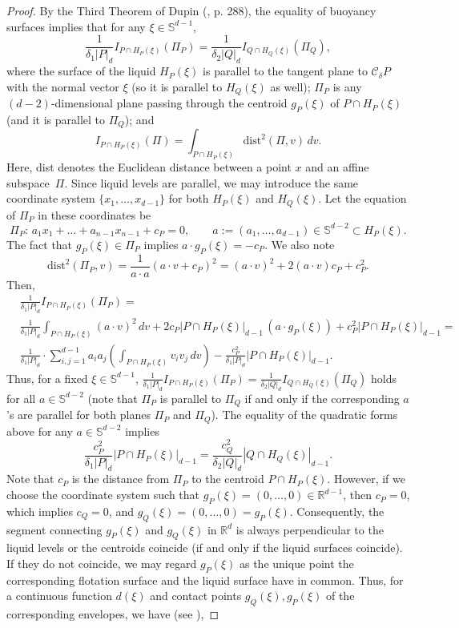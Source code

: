 \documentclass[12pt,letterpaper,reqno]{amsart}
\begin{document}
\begin{proof}
By the Third Theorem of Dupin (\cite{VP}, p. 288), the equality of buoyancy surfaces implies that for any $\xi \in \mathbb{S}^{d-1}$,
$$
\frac{1}{\delta_1|P|_d} I_{P \cap H_P(\xi)} (\Pi_P) = \frac{1}{\delta_2|Q|_d} I_{Q \cap H_Q(\xi)} (\Pi_Q),
$$
where
the surface of the liquid $H_P(\xi)$ is parallel to the tangent plane to $\mathcal{C}_\delta P$ with the normal vector $\xi$ (so it is parallel to $H_Q(\xi)$ as well);
$\Pi_P$ is any $(d-2)$-dimensional plane passing through the centroid $g_P(\xi)$ of $P\cap H_P(\xi)$ (and it is parallel to $\Pi_Q$); and
$$
I_{P \cap H_P(\xi)} (\Pi) = \int_{P\cap H_P(\xi)}\text{dist}^2(\Pi,v) \, dv.
$$
Here, dist denotes the Euclidean distance between a point $x$ and an affine subspace~$\Pi$. Since liquid levels are parallel, we may introduce the same coordinate system $\{x_1, \ldots,x_{d-1}\}$ for both $H_P(\xi)$ and $H_Q(\xi)$. Let the equation of $\Pi_P$ in these coordinates be
$$
\Pi_P: \, a_1x_1+\ldots+a_{n-1}x_{n-1} + c_P = 0, \qquad a:=(a_1,\ldots,a_{d-1}) \in \mathbb{S}^{d-2} \subset H_P(\xi).
$$
The fact that $g_P(\xi) \in \Pi_P$ implies $a \cdot g_P(\xi) = -c_P$.
We also note
$$
\text{dist}^2(\Pi_P,v) = \frac{1}{a\cdot a}(a \cdot v + c_P)^2 = (a\cdot v)^2 + 2(a \cdot v) c_P + c_P^2.
$$
Then,
\begin{align*}
&\frac{1}{\delta_1|P|_d} I_{P \cap H_P(\xi)} (\Pi_P) =\\
&\frac{1}{\delta_1|P|_d} \int_{P\cap H_P(\xi)}(a \cdot v)^2 \, dv + 2c_P |P \cap H_P(\xi)|_{d-1} \, (a \cdot g_P(\xi))  + c_P^2 |P \cap H_P(\xi)|_{d-1} = \\
&\frac{1}{\delta_1|P|_d} \cdot \sum_{i,j=1}^{d-1} a_i a_j \left(\int_{P\cap H_P(\xi)} v_i v_j \, dv\right) - \frac{c_P^2}{\delta_1|P|_d} |P \cap H_P(\xi)|_{d-1}. 
\end{align*}
Thus, for a fixed $\xi \in \mathbb{S}^{d-1}$,
$\frac{1}{\delta_1|P|_d} I_{P \cap H_P(\xi)} (\Pi_P) = \frac{1}{\delta_2|Q|_d} I_{Q \cap H_Q(\xi)} (\Pi_Q)$ holds for all $a \in \mathbb{S}^{d-2}$ (note that $\Pi_P$ is parallel to $\Pi_Q$ if and only if the corresponding $a$'s are parallel for both planes $\Pi_P$ and $\Pi_Q$). The equality of the quadratic forms above for any $a \in \mathbb{S}^{d-2}$ implies
$$
\frac{c_P^2}{\delta_1 |P|_d}  |P \cap H_P(\xi)|_{d-1} = \frac{c_Q^2}{\delta_2  |Q|_d}  |Q \cap H_Q(\xi)|_{d-1}.
$$
Note that $c_P$ is the distance from $\Pi_P$ to the centroid $P \cap H_P(\xi)$. However, if we choose the coordinate system such that $g_P(\xi) = (0,\ldots,0) \in \mathbb{R}^{d-1}$, then $c_P = 0$, which implies $c_Q = 0$, and $g_Q(\xi) = (0,\ldots,0) = g_P(\xi)$. Consequently, the segment connecting $g_P(\xi)$ and $g_Q(\xi)$ in $\mathbb{R}^{d}$ is always perpendicular to the liquid levels or the centroids coincide (if and only if the liquid surfaces coincide). If they do not coincide, we may regard $g_P(\xi)$ as the unique point the corresponding flotation surface and the liquid surface have in common. Thus, for a continuous function $d(\xi)$ and contact points $g_Q(\xi), g_P(\xi)$ of the corresponding envelopes, we have (see \cite{MM}),

\end{proof}
\end{document}
